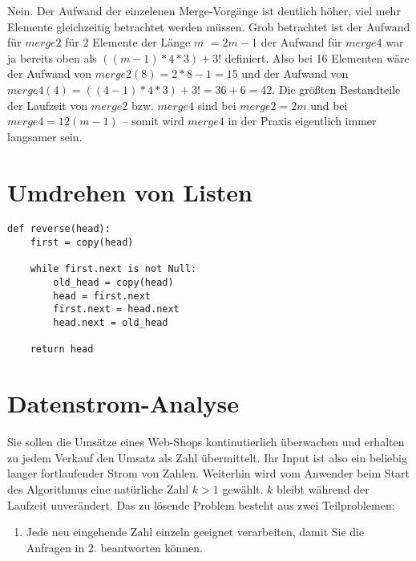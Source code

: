 \documentclass{article}
\begin{document}
Nein. Der Aufwand der einzelenen Merge-Vorgänge ist deutlich höher, viel mehr Elemente
gleichzeitig betrachtet werden müssen. Grob betrachtet ist der Aufwand für $merge2$ für
2 Elemente der Länge $m$ $= 2m - 1$ der Aufwand für $merge4$ war ja bereits oben als
$((m - 1) * 4 * 3) + 3!$ definiert. Also bei 16 Elementen wäre der Aufwand von
$merge2(8) = 2 * 8 - 1 = 15$ und der Aufwand von $merge4(4) = ((4 - 1) * 4 * 3) + 3! = 36 + 6 = 42$.
Die größten Bestandteile der Laufzeit von $merge2$ bzw. $merge4$ sind bei $merge2 = 2m$
und bei $merge4 = 12(m - 1)$ – somit wird $merge4$ in der Praxis eigentlich immer langsamer
sein.

\newpage

\section{Umdrehen von Listen}

\begin{lstlisting}
def reverse(head):
    first = copy(head)

    while first.next is not Null:
        old_head = copy(head)
        head = first.next
        first.next = head.next
        head.next = old_head

    return head
\end{lstlisting}


\section{Datenstrom-Analyse}
Sie sollen die Umsätze eines Web-Shops kontinutierlich überwachen und erhalten zu jedem
Verkauf den Umsatz als Zahl übermittelt. Ihr Input ist also ein beliebig langer fortlaufender
Strom von Zahlen. Weiterhin wird vom Anwender beim Start des Algorithmus eine natürliche Zahl
$k > 1$ gewählt. $k$ bleibt während der Laufzeit unverändert. Das zu lösende Problem besteht
aus zwei Teilproblemen:

\begin{enumerate}
	\item{Jede neu eingehende Zahl einzeln geeignet verarbeiten, damit Sie die Anfragen in 2.
		beantworten können.}
\end{enumerate}
\end{document}
